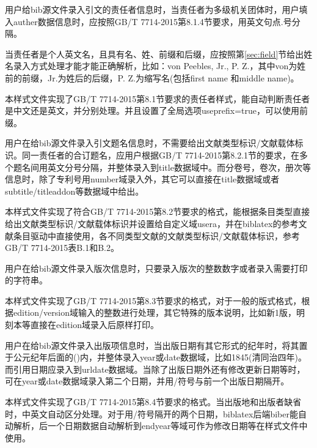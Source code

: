 \begin{property}{}{}
用户给bib源文件录入引文的责任者信息时，当责任者为多级机关团体时，用户填入auther数据信息时，应按照GB/T 7714-2015第8.1.4节要求，用英文句点.号分隔。

当责任者是个人英文名，且具有名、姓、前缀和后缀，应按照第\ref{sec:field}节给出姓名录入方式处理才能才能正确解析，比如：von Peebles, Jr., P. Z.，其中von为姓前的前缀，Jr.为姓后的后缀，P. Z.为缩写名(包括first name 和middle name)。

本样式文件实现了GB/T 7714-2015第8.1节要求的责任者样式，能自动判断责任者是中文还是英文，并分别处理。并且设置了全局选项useprefix=true，可以使用前缀。
\end{property}

\begin{property}{}{}
用户在给bib源文件录入引文题名信息时，不需要给出文献类型标识/文献载体标识。同一责任者的合订题名，应用户根据GB/T 7714-2015第8.2.1节的要求，在多个题名间用英文分号分隔，并整体录入到title数据域中。而分卷号，卷次，册次等信息时，除了专利号用number域录入外，其它可以直接在title数据域或者subtitle/titleaddon等数据域中给出。

本样式文件实现了符合GB/T 7714-2015第8.2节要求的格式，能根据条目类型直接给出文献类型标识/文献载体标识并设置给自定义域usera，并在biblatex的参考文献条目驱动中直接使用，各不同类型文献的文献类型标识/文献载体标识，参考GB/T 7714-2015表B.1和B.2。
\end{property}

\begin{property}{}{}
用户在给bib源文件录入版次信息时，只要录入版次的整数数字或者录入需要打印的字符串。

本样式文件实现了GB/T 7714-2015第8.3节要求的格式，对于一般的版式格式，根据edition/version域输入的整数进行处理，其它特殊的版本说明，比如新1版，明刻本等直接在edition域录入后原样打印。
\end{property}

\begin{property}{}{}
用户在给bib源文件录入出版项信息时，当出版日期有其它形式的纪年时，将其置于公元纪年后面的()内，并整体录入year或date数据域，比如1845(清同治四年)。而引用日期应录入到urldate数据域。当除了出版日期外还有修改更新日期等时，可在year或date数据域录入第二个日期，并用/符号与前一个出版日期隔开。

本样式文件实现了GB/T 7714-2015第8.4节要求的格式。当出版地和出版者缺省时，中英文自动区分处理。对于用/符号隔开的两个日期，biblatex后端biber能自动解析，后一个日期数据自动解析到endyear等域可作为修改日期等在样式文件中使用。
\end{property}


